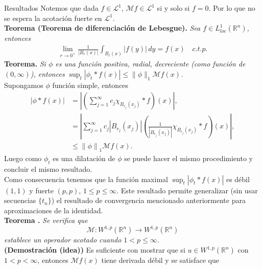 \documentclass[final]{beamer}
\providecommand{\norm}[1]{\left\|#1\right\|}
\newlength{\colwidth}
\begin{document}
\begin{frame}[t]
\begin{columns}[t]
\begin{column}{\colwidth}
\begin{alertblock}{Resultados}
      \vspace{0.2cm}
      Notemos que dada $f\in \mathcal{L}^1$, $\mathcal{M}f \in \mathcal{L}^1$ si y solo si $f=0$. Por lo que no se espera la acotación fuerte en $\mathcal{L}^1$.\\
      \vspace{0.2cm}
    \textbf{Teorema (Teorema de diferenciación de Lebesgue).} \emph{Sea $f\in L^{1}_{loc}(\mathbb{R}^{n})$, entonces
      \begin{align*}
        \lim_{r \to 0^{+}}\frac{1}{|B_{r}(x)|}\int_{B_{r}(x)}|f(y)|\, dy=f(x)\quad c.t.p.
      \end{align*}}
      \vspace{0.2cm}
    \textbf{Teorema.} \emph{Si $\phi$ es una función positiva, radial, decreciente (como función de $(0,\infty)$), entonces $\sup_{t}|\phi_t\ast f(x)|\leq \|\phi\|_1\mathcal{M}f(x)$.}\\
      Supongamos $\phi$ función simple, entonces
      \begin{align*}
        \left|\phi*f(x)\right|&=\left|\left(\sum_{j=1}^{\infty}c_j\chi_{B_{r_j}(x_j)}*f\right)(x)\right|,\\
        &=\left|\sum_{j=1}^{\infty}c_{j}|B_{r_j}(x_j)|\left( \frac{1}{|B_{r_{j}}(x_j)|}\chi_{B_{r_j}(x_j)}*f \right)(x)\right|,\\
        &\leq\norm{\phi}_{1}\mathcal{M}f(x).
      \end{align*}
      Luego como $\phi_{t}$ es una dilatación de $\phi$ se puede hacer el mismo procedimiento y concluir el mismo resultado.\\
      \vspace{0.2cm}
      Como consecuencia tenemos que la función maximal $\sup_{t}|\phi_t\ast f(x)|$ es débil $(1,1)$ y fuerte $(p,p)$, $1\leq p \leq \infty$.
      Este resultado permite generalizar (sin usar secuencias $\{t_n\}$) el resultado de convergencia mencionado anteriormente para aproximaciones de la identidad.\\ 
    \textbf{Teorema \cite{MR1469106}.} \emph{Se verifica  que
      \begin{equation*}
          \mathcal{M}:W^{1,p}(\mathbb{R}^n)\rightarrow W^{1,p}(\mathbb{R}^n) 
      \end{equation*}
      establece un operador acotado cuando $1<p\leq \infty$.}\\
      \vspace{0.2cm}
      \textbf{(Demostración (idea))} Es suficiente con mostrar que si $u\in W^{1,p}(\mathbb{R}^{n})$ con $1<p< \infty$, entonces $\mathcal{M}f(x)$ tiene derivada débil y se satisface que

\end{alertblock}
\end{column}
\end{columns}
\end{frame}
\end{document}
